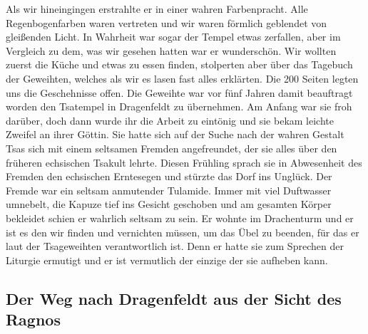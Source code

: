 \documentclass[11pt]{scrreprt}
\begin{document}
Als wir hineingingen erstrahlte er in einer wahren Farbenpracht. Alle Regenbogenfarben waren vertreten und wir waren förmlich geblendet von gleißenden Licht. In Wahrheit war sogar der Tempel etwas zerfallen, aber im Vergleich zu dem, was wir gesehen hatten war er wunderschön. Wir wollten zuerst die Küche und etwas zu essen finden, stolperten aber über das Tagebuch der Geweihten, welches als wir es lasen fast alles erklärten. Die 200 Seiten legten uns die Geschehnisse offen. Die Geweihte war vor fünf Jahren damit beauftragt worden den Tsatempel in Dragenfeldt  zu übernehmen. Am Anfang war sie froh darüber, doch dann wurde ihr die Arbeit zu eintönig und sie bekam leichte Zweifel an ihrer Göttin. Sie hatte sich auf der Suche nach der wahren Gestalt Tsas sich mit einem seltsamen Fremden angefreundet, der sie alles über den früheren echsischen Tsakult lehrte. Diesen Frühling sprach sie in Abwesenheit des Fremden den echsischen Erntesegen und stürzte das Dorf ins Unglück. Der Fremde war ein seltsam anmutender Tulamide. Immer mit viel Duftwasser umnebelt, die Kapuze tief ins Gesicht geschoben und am gesamten Körper bekleidet schien er wahrlich seltsam zu sein. Er wohnte im Drachenturm und er ist es den wir finden und vernichten müssen, um das Übel zu beenden, für das er laut der Tsageweihten verantwortlich ist. Denn er hatte sie zum Sprechen der Liturgie ermutigt und er ist vermutlich der einzige der sie aufheben kann.

\subsection{Der Weg nach Dragenfeldt aus der Sicht des Ragnos}
\end{document}
